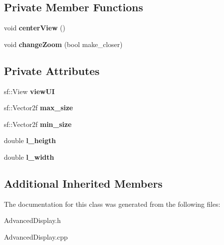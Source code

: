 \subsection*{Private Member Functions}
\begin{DoxyCompactItemize}
\item 
\mbox{\label{class_advanced_display_a7bc4ba26e6834551f95769ff6be3da84}} 
void {\bfseries center\+View} ()
\item 
\mbox{\label{class_advanced_display_adaa4a1772d599c5224bf8f0c3476138a}} 
void {\bfseries change\+Zoom} (bool make\+\_\+closer)
\end{DoxyCompactItemize}
\subsection*{Private Attributes}
\begin{DoxyCompactItemize}
\item 
\mbox{\label{class_advanced_display_a1d6b163d432d3a1fa01568fbebd5e496}} 
sf\+::\+View {\bfseries view\+UI}
\item 
\mbox{\label{class_advanced_display_a77c1ded61c1988f130205e4248f0bd07}} 
sf\+::\+Vector2f {\bfseries max\+\_\+size}
\item 
\mbox{\label{class_advanced_display_a5a51a04f2b299f784ec96c9438b84a9d}} 
sf\+::\+Vector2f {\bfseries min\+\_\+size}
\item 
\mbox{\label{class_advanced_display_a2107d1ad65c137bdf4fe2ebb64cff29c}} 
double {\bfseries l\+\_\+heigth}
\item 
\mbox{\label{class_advanced_display_ae8c55cb678ad26dbbb47b6a837a74886}} 
double {\bfseries l\+\_\+width}
\end{DoxyCompactItemize}
\subsection*{Additional Inherited Members}


The documentation for this class was generated from the following files\+:\begin{DoxyCompactItemize}
\item 
Advanced\+Display.\+h\item 
Advanced\+Display.\+cpp\end{DoxyCompactItemize}
